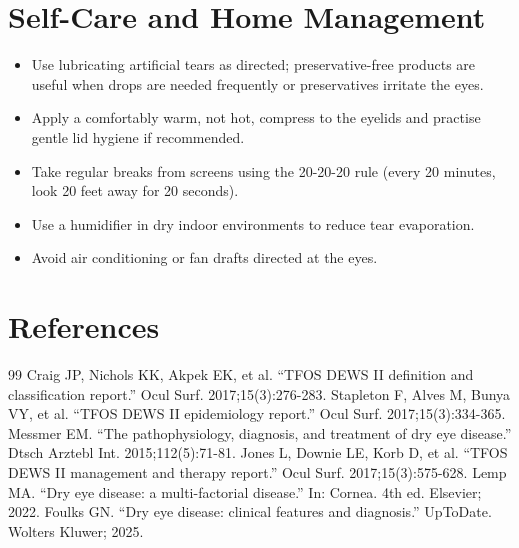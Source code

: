 \section*{Self-Care and Home Management}
\begin{itemize}
  \item Use lubricating artificial tears as directed; preservative-free products are useful when drops are needed frequently or preservatives irritate the eyes.
  \item Apply a comfortably warm, not hot, compress to the eyelids and practise gentle lid hygiene if recommended.
  \item Take regular breaks from screens using the 20-20-20 rule (every 20 minutes, look 20 feet away for 20 seconds).
  \item Use a humidifier in dry indoor environments to reduce tear evaporation.
  \item Avoid air conditioning or fan drafts directed at the eyes.
\end{itemize}

\section*{References}
\begin{thebibliography}{99}
 Craig JP, Nichols KK, Akpek EK, et al. ``TFOS DEWS II definition and classification report.'' Ocul Surf. 2017;15(3):276-283.
 Stapleton F, Alves M, Bunya VY, et al. ``TFOS DEWS II epidemiology report.'' Ocul Surf. 2017;15(3):334-365.
 Messmer EM. ``The pathophysiology, diagnosis, and treatment of dry eye disease.'' Dtsch Arztebl Int. 2015;112(5):71-81.
 Jones L, Downie LE, Korb D, et al. ``TFOS DEWS II management and therapy report.'' Ocul Surf. 2017;15(3):575-628.
 Lemp MA. ``Dry eye disease: a multi-factorial disease.'' In: Cornea. 4th ed. Elsevier; 2022.
 Foulks GN. ``Dry eye disease: clinical features and diagnosis.'' UpToDate. Wolters Kluwer; 2025.
\end{thebibliography}
